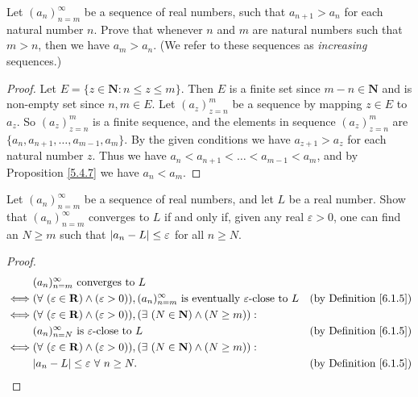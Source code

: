 \exercisesection

\begin{exercise}\label{ex 6.1.1}
Let \((a_n)_{n = m}^\infty\) be a sequence of real numbers, such that \(a_{n + 1} > a_n\) for each natural number \(n\).
Prove that whenever \(n\) and \(m\) are natural numbers such that \(m > n\), then we have \(a_m > a_n\).
(We refer to these sequences as \emph{increasing} sequences.)
\end{exercise}

\begin{proof}
Let \(E = \{z \in \mathbf{N} : n \leq z \leq m\}\).
Then \(E\) is a finite set since \(m - n \in \mathbf{N}\) and is non-empty set since \(n, m \in E\).
Let \((a_z)_{z = n}^m\) be a sequence by mapping \(z \in E\) to \(a_z\).
So \((a_z)_{z = n}^m\) is a finite sequence, and the elements in sequence \((a_z)_{z = n}^m\) are \(\{a_n, a_{n + 1}, \dots, a_{m - 1}, a_m\}\).
By the given conditions we have \(a_{z + 1} > a_z\) for each natural number \(z\).
Thus we have \(a_n < a_{n + 1} < \dots < a_{m - 1} < a_m\), and by Proposition \ref{5.4.7} we have \(a_n < a_m\).
\end{proof}

\begin{exercise}\label{ex 6.1.2}
Let \((a_n)_{n = m}^\infty\) be a sequence of real numbers, and let \(L\) be a real number.
Show that \((a_n)_{n = m}^\infty\) converges to \(L\) if and only if, given any real \(\varepsilon > 0\), one can find an \(N \geq m\) such that \(\abs*{a_n - L} \leq \varepsilon\) for all \(n \geq N\).
\end{exercise}

\begin{proof}
\begin{align*}
& (a_n)_{n = m}^\infty \text{ converges to } L \\
\iff & (\forall\ (\varepsilon \in \mathbf{R}) \land (\varepsilon > 0)), (a_n)_{n = m}^\infty \text{ is eventually } \varepsilon\text{-close to } L & \text{(by Definition \ref{6.1.5})} \\
\iff & (\forall\ (\varepsilon \in \mathbf{R}) \land (\varepsilon > 0)), (\exists\ (N \in \mathbf{N}) \land (N \geq m)) : \\
& (a_n)_{n = N}^\infty \text{ is } \varepsilon\text{-close to } L & \text{(by Definition \ref{6.1.5})} \\
\iff & (\forall\ (\varepsilon \in \mathbf{R}) \land (\varepsilon > 0)), (\exists\ (N \in \mathbf{N}) \land (N \geq m)) : \\
& \abs*{a_n - L} \leq \varepsilon \ \forall\ n \geq N. & \text{(by Definition \ref{6.1.5})}
\end{align*}
\end{proof}

